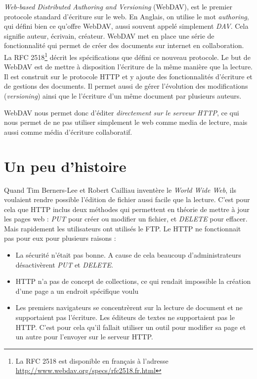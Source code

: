 \documentclass[a4paper, 11pt]{article}
\begin{document}
{	\emph{Web-based Distributed Authoring and Versioning} (WebDAV), est le premier protocole standard d'écriture sur le web. En Anglais, on utilise le mot \emph{authoring}, qui défini bien ce qu'offre WebDAV, aussi souvent appelé simplement \emph{DAV}. Cela signifie auteur, écrivain, créateur. WebDAV met en place une série de fonctionnalité qui permet de créer des documents sur internet en collaboration. La RFC 2518\footnote{La RFC 2518 est disponible en français à l'adresse \url{http://www.webdav.org/specs/rfc2518.fr.html}} décrit les spécifications que défini ce nouveau protocole. Le but de WebDAV est de mettre à disposition l'écriture de la même manière que la lecture. Il est construit sur le protocole HTTP et y ajoute des fonctionnalités d'écriture et de gestions des documents. Il permet aussi de gérer l'évolution des modifications (\emph{versioning}) ainsi que le l'écriture d'un même document par plusieurs auteurs.
		
		WebDAV nous permet donc d'éditer \emph{directement sur le serveur HTTP}, ce qui nous permet de ne pas utiliser simplement le web comme media de lecture, mais aussi comme média d'écriture collaboratif. 
		
		
		

\section{Un peu d'histoire}

	
	Quand Tim Berners-Lee et Robert Cailliau inventère le \emph{World Wide Web}, ils voulaient rendre possible l'édition de fichier aussi facile que la lecture. C'est pour cela que HTTP inclus deux méthodes qui permettent en théorie de mettre à jour les pages web : \emph{PUT} pour créer ou modifier un fichier, et \emph{DELETE} pour effacer. Mais rapidement les utilisateurs ont utilisés le FTP. Le HTTP ne fonctionnait pas pour eux pour plusieurs raisons : 

	\begin{itemize}
		\item 	La sécurité n'était pas bonne. A cause de cela beaucoup d'administrateurs désactivèrent \emph{PUT} et \emph{DELETE}.
		\item 	HTTP n'a pas de concept de collections, ce qui rendait impossible la création d'une page a un endroit spécifique voulu
		\item 	Les premiers navigateurs se concentrèrent sur la lecture de document et ne supportaient pas l'écriture. Les éditeurs de textes ne supportaient pas le HTTP. C'est pour cela qu'il fallait utiliser un outil pour modifier sa page et un autre pour l'envoyer sur le serveur HTTP.
	\end{itemize}
			
}
\end{document}
